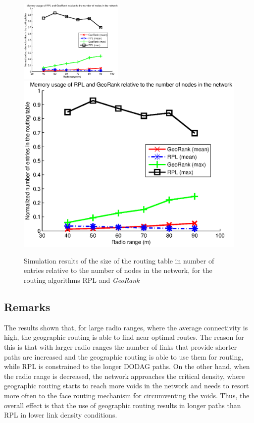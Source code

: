 \documentclass[final,authoryear,3p,twocolumn]{elsarticle}
\begin{document}
\begin{figure}
\centering
\ifdefined\TWOCOL
\includegraphics[width=0.45\textwidth]{figures/mem_usage_range.eps}
\else
\includegraphics[width=1\textwidth]{mem_usage_range.eps}
\fi
\caption{Simulation results of the size of the routing table in number of entries relative to the number of nodes in the network, for the routing algorithms RPL and \textit{GeoRank}}
\label{sim_results2}
\end{figure}

\subsection{Remarks}

The results shown that, for large radio ranges, where the average connectivity is high, the geographic routing is able to find near optimal routes. The reason for this is that with larger radio ranges the number of links that provide shorter paths are increased and the geographic routing is able to use them for routing, while RPL is constrained to the longer DODAG paths. On the other hand, when the radio range is decreased, the network approaches the critical density, where geographic routing starts to reach more voids in the network and needs to resort more often to the face routing mechanism for circumventing the voids. Thus, the overall effect is that the use of geographic routing results in longer paths than RPL in lower link density conditions.
\end{document}
